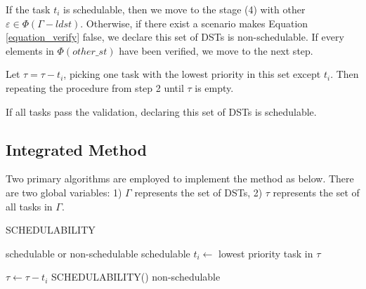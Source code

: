 \documentclass[10pt,conference]{IEEEtran}
\begin{document}
\begin{compactenum}
  \item If the task $t_i$ is schedulable, then we move to the stage (4) with other $\varepsilon\in\Phi(\Gamma-ldst)$. Otherwise, if there exist a scenario makes Equation \ref{equation_verify} false, we declare this set of DSTs is non-schedulable. If every elements in $\Phi(other\_st)$ have been verified, we move to the next step.
  \item Let $\tau=\tau-{t_i}$, picking one task with the lowest priority in this set except $t_i$. Then repeating the procedure from step 2 until $\tau$ is empty.%
  \item If all tasks pass the validation, declaring this set of DSTs is schedulable.%
\end{compactenum}

\subsection{Integrated Method}
Two primary algorithms are employed to implement the method as below. There are two global variables: 1) $\Gamma$ represents the set of DSTs, 2) $\tau$ represents the set of all tasks in $\Gamma$.

\begin{algorithm}
  \caption{SCHEDULABILITY}
  \label{algorithm_schedulability}
  \begin{algorithmic}[1]
    \REQUIRE 
    \ENSURE schedulable or non-schedulable 
    \IF{$\tau=\varnothing$}
    \STATE \Return schedulable
    \ELSE \STATE $t_i \leftarrow$ lowest priority task in $\tau$

    \STATE $\tau\leftarrow \tau-t_i$
    \STATE \Return SCHEDULABILITY()
    \ELSE
    \STATE \Return non-schedulable 
    \ENDIF
    \ENDIF
  \end{algorithmic}
\end{algorithm}
\end{document}
